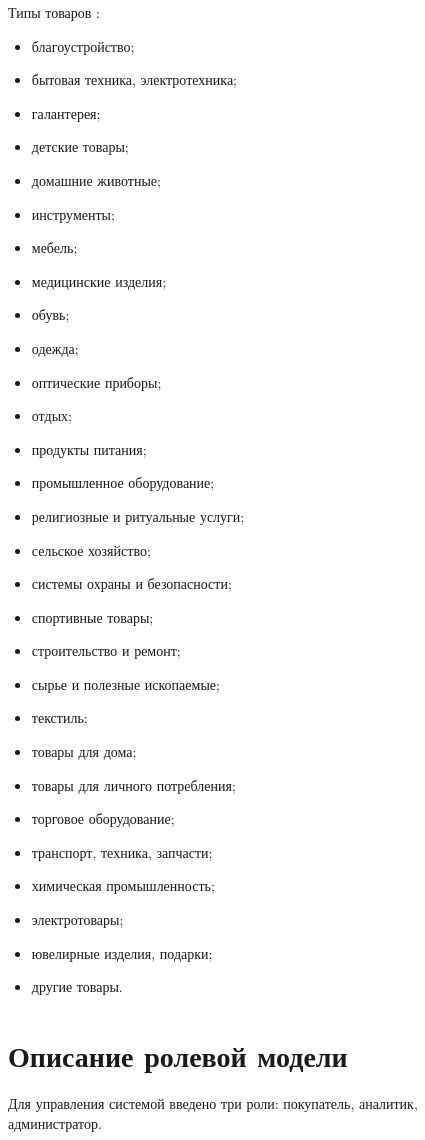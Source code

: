 \documentclass[a4paper,14pt]{extreport}
\begin{document}
Типы товаров \cite{prod_types}:
\begin{itemize}
	\setlength\itemsep{0.01em}
	\item благоустройство;
	\item бытовая техника, электротехника;
	\item галантерея;
	\item детские товары;
	\item домашние животные;
	\item инструменты;
	\item мебель;
	\item медицинские изделия;
	\item обувь;
	\item одежда;
	\item оптические приборы;
	\item отдых;
	\item продукты питания;
	\item промышленное оборудование;
	\item религиозные и ритуальные услуги;
	\item сельское хозяйство;
	\item системы охраны и безопасности;
	\item спортивные товары;
	\item строительство и ремонт;
	\item сырье и полезные ископаемые;
	\item текстиль;
	\item товары для дома;
	\item товары для личного потребления;
	\item торговое оборудование;
	\item транспорт, техника, запчасти;
	\item химическая промышленность;
	\item электротовары;
	\item ювелирные изделия, подарки;
	\item другие товары.
\end{itemize}

\section{Описание ролевой модели}

Для управления системой введено три роли: покупатель, аналитик, администратор.
\end{document}
